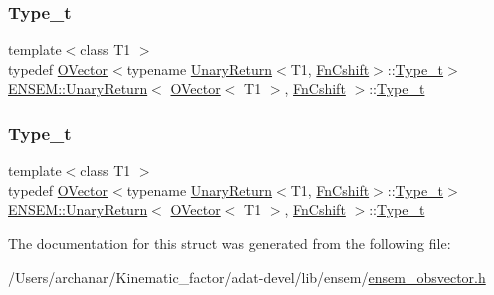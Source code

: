\subsubsection{\texorpdfstring{Type\_t}{Type\_t}\hspace{0.1cm}{\footnotesize\ttfamily [2/3]}}
{\footnotesize\ttfamily template$<$class T1 $>$ \\
typedef \mbox{\hyperlink{classENSEM_1_1OVector}{O\+Vector}}$<$typename \mbox{\hyperlink{structENSEM_1_1UnaryReturn}{Unary\+Return}}$<$T1, \mbox{\hyperlink{structENSEM_1_1FnCshift}{Fn\+Cshift}}$>$\+::\mbox{\hyperlink{structENSEM_1_1UnaryReturn_3_01OVector_3_01T1_01_4_00_01FnCshift_01_4_a6a3a9c4bf8437765b92d9c0d26f56a19}{Type\+\_\+t}}$>$ \mbox{\hyperlink{structENSEM_1_1UnaryReturn}{E\+N\+S\+E\+M\+::\+Unary\+Return}}$<$ \mbox{\hyperlink{classENSEM_1_1OVector}{O\+Vector}}$<$ T1 $>$, \mbox{\hyperlink{structENSEM_1_1FnCshift}{Fn\+Cshift}} $>$\+::\mbox{\hyperlink{structENSEM_1_1UnaryReturn_3_01OVector_3_01T1_01_4_00_01FnCshift_01_4_a6a3a9c4bf8437765b92d9c0d26f56a19}{Type\+\_\+t}}}

\mbox{\label{structENSEM_1_1UnaryReturn_3_01OVector_3_01T1_01_4_00_01FnCshift_01_4_a6a3a9c4bf8437765b92d9c0d26f56a19}} 
\subsubsection{\texorpdfstring{Type\_t}{Type\_t}\hspace{0.1cm}{\footnotesize\ttfamily [3/3]}}
{\footnotesize\ttfamily template$<$class T1 $>$ \\
typedef \mbox{\hyperlink{classENSEM_1_1OVector}{O\+Vector}}$<$typename \mbox{\hyperlink{structENSEM_1_1UnaryReturn}{Unary\+Return}}$<$T1, \mbox{\hyperlink{structENSEM_1_1FnCshift}{Fn\+Cshift}}$>$\+::\mbox{\hyperlink{structENSEM_1_1UnaryReturn_3_01OVector_3_01T1_01_4_00_01FnCshift_01_4_a6a3a9c4bf8437765b92d9c0d26f56a19}{Type\+\_\+t}}$>$ \mbox{\hyperlink{structENSEM_1_1UnaryReturn}{E\+N\+S\+E\+M\+::\+Unary\+Return}}$<$ \mbox{\hyperlink{classENSEM_1_1OVector}{O\+Vector}}$<$ T1 $>$, \mbox{\hyperlink{structENSEM_1_1FnCshift}{Fn\+Cshift}} $>$\+::\mbox{\hyperlink{structENSEM_1_1UnaryReturn_3_01OVector_3_01T1_01_4_00_01FnCshift_01_4_a6a3a9c4bf8437765b92d9c0d26f56a19}{Type\+\_\+t}}}



The documentation for this struct was generated from the following file\+:\begin{DoxyCompactItemize}
\item 
/\+Users/archanar/\+Kinematic\+\_\+factor/adat-\/devel/lib/ensem/\mbox{\hyperlink{adat-devel_2lib_2ensem_2ensem__obsvector_8h}{ensem\+\_\+obsvector.\+h}}\end{DoxyCompactItemize}
